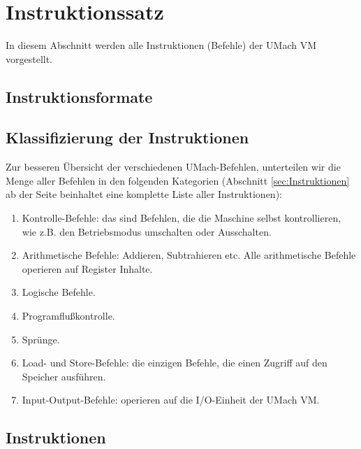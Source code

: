 \chapter{Instruktionssatz}

In diesem Abschnitt werden alle Instruktionen (Befehle) der UMach VM
vorgestellt.

\section{Instruktionsformate}
\blindtext

\section{Klassifizierung der Instruktionen}
Zur besseren Übersicht der verschiedenen UMach-Befehlen, unterteilen wir die
Menge aller Befehlen in den folgenden Kategorien
(Abschnitt \ref{sec:Instruktionen} ab der Seite
\pageref{sec:Instruktionen} beinhaltet eine komplette Liste aller
Instruktionen):

\begin{enumerate}
  \item Kontrolle-Befehle: das sind Befehlen, die die Maschine selbst
    kontrollieren, wie z.B. den Betriebsmodus umschalten oder Ausschalten.
  \item Arithmetische Befehle: Addieren, Subtrahieren etc. Alle arithmetische
    Befehle operieren auf Register Inhalte.
  \item Logische Befehle.
  \item Programflußkontrolle.
  \item Sprünge.
  \item Load- und Store-Befehle: die einzigen Befehle, die einen Zugriff auf den
    Speicher ausführen.
  \item Input-Output-Befehle: operieren auf die I/O-Einheit der UMach VM.
\end{enumerate}


\section{Instruktionen}
\label{sec:Instruktionen}

\blindtext



